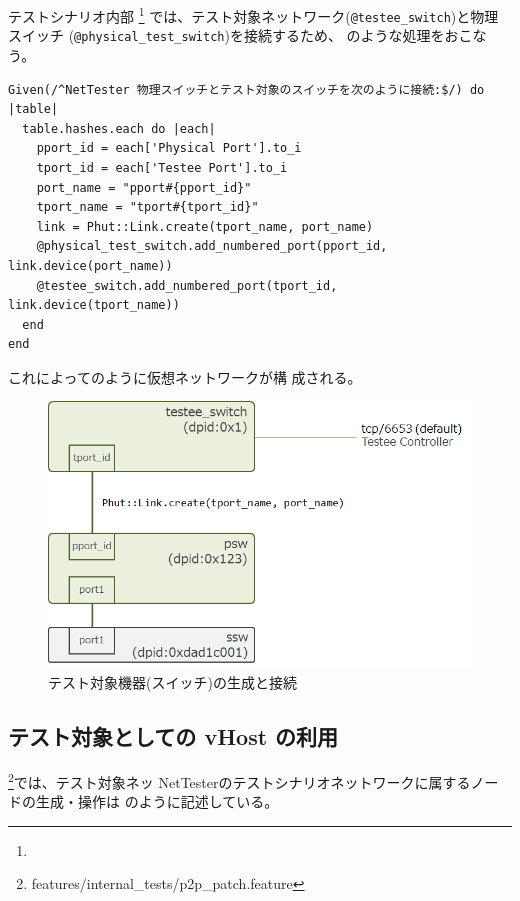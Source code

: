 テストシナリオ内部
\footnote{}
では、テスト対象ネットワーク(\verb|@testee_switch|)と物理スイッチ
(\verb|@physical_test_switch|)を接続するため、
のような処理をおこなう。

\begin{lstlisting}[caption=vSwitch間接続,label=lst:connect-vswitch]
Given(/^NetTester 物理スイッチとテスト対象のスイッチを次のように接続:$/) do |table|
  table.hashes.each do |each|
    pport_id = each['Physical Port'].to_i
    tport_id = each['Testee Port'].to_i
    port_name = "pport#{pport_id}"
    tport_name = "tport#{tport_id}"
    link = Phut::Link.create(tport_name, port_name)
    @physical_test_switch.add_numbered_port(pport_id, link.device(port_name))
    @testee_switch.add_numbered_port(tport_id, link.device(tport_name))
  end
end
\end{lstlisting}

これによってのように仮想ネットワークが構
成される。

\begin{figure}[h]
 \centering
 \includegraphics[scale=0.6]{img/phut-testee-switch.png}
 \caption{テスト対象機器(スイッチ)の生成と接続}
 \label{fig:phut-testee-switch}
\end{figure}

\subsection{テスト対象としての vHost の利用}

\footnote{features/internal\_tests/p2p\_patch.feature}では、テスト対象ネッ
NetTesterのテストシナリオネットワークに属するノードの生成・操作は
のように記述している。

